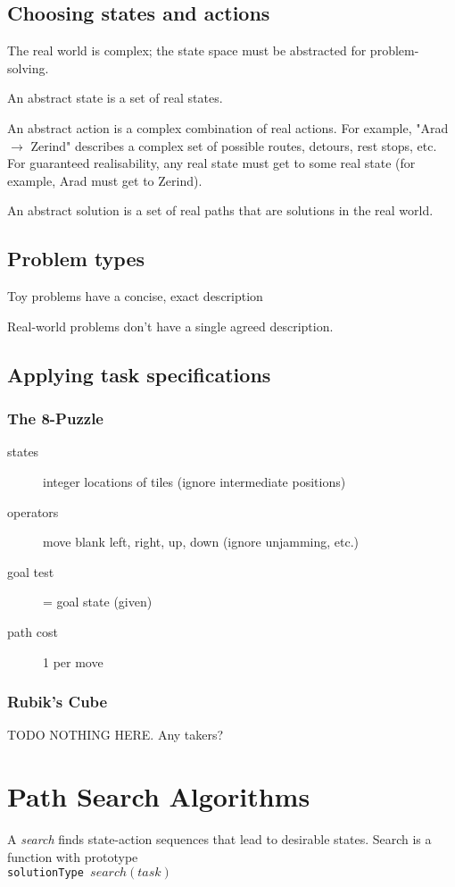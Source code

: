 \subsection{Choosing states and actions}
The real world is complex; the state space must be abstracted for
problem-solving.

An abstract state is a set of real states.

An abstract action is a complex combination of real actions. For example, "Arad
$\rightarrow$ Zerind" describes a complex set of possible routes, detours, rest stops,
etc.
For guaranteed realisability, any real state must get to some real state (for
example, Arad must get to Zerind).

An abstract solution is a set of real paths that are solutions in the real
world.

\subsection{Problem types}
Toy problems have a concise, exact description

Real-world problems don't have a single agreed description.

\subsection{Applying task specifications}
\subsubsection{The 8-Puzzle}
\begin{description}
    \item[states] integer locations of tiles (ignore intermediate positions)
    \item[operators] move blank left, right, up, down (ignore unjamming, etc.)
    \item[goal test] = goal state (given)
    \item[path cost] 1 per move
\end{description}

\subsubsection{Rubik's Cube}
TODO NOTHING HERE. Any takers?

\section{Path Search Algorithms}
A \textit{search} finds state-action sequences that lead to desirable states.
Search is a function with prototype\\
\indent \texttt{solutionType $search(task)$}


